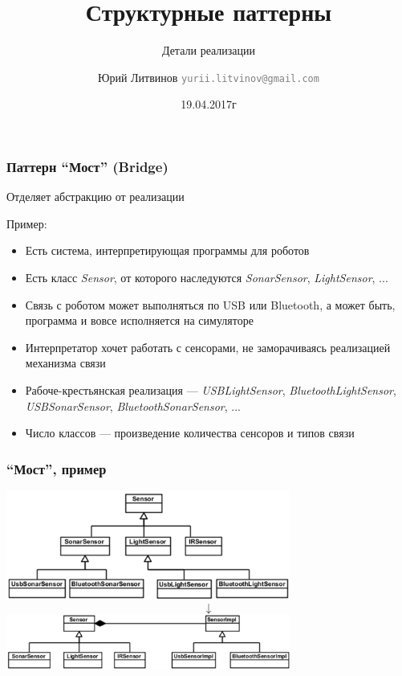 \documentclass[xetex,mathserif,serif]{beamer}
\title{Структурные паттерны}
\subtitle{Детали реализации}
\author[Юрий Литвинов]{Юрий Литвинов \newline \textcolor{gray}{\small\texttt{yurii.litvinov@gmail.com}}}
\date{19.04.2017г}
\begin{document}
	
	\frame{\titlepage}

	\begin{frame}
		\frametitle{Паттерн ``Мост'' (Bridge)}
		Отделяет абстракцию от реализации

		Пример:
		\begin{itemize}
			\item Есть система, интерпретирующая программы для роботов
			\item Есть класс \textit{Sensor}, от которого наследуются \textit{SonarSensor}, \textit{LightSensor}, ...
			\item Связь с роботом может выполняться по USB или Bluetooth, а может быть, программа и вовсе исполняется на симуляторе
			\item Интерпретатор хочет работать с сенсорами, не заморачиваясь реализацией механизма связи
			\item Рабоче-крестьянская реализация --- \textit{USBLightSensor}, \textit{BluetoothLightSensor}, \textit{USBSonarSensor}, \textit{BluetoothSonarSensor}, ...
			\item Число классов --- произведение количества сенсоров и типов связи
		\end{itemize}
	\end{frame}

	\begin{frame}
		\frametitle{``Мост'', пример}
		\begin{center}
			\includegraphics[width=0.7\textwidth]{noBridge.png}
			\Huge{$$\downarrow$$}
			\includegraphics[width=0.7\textwidth]{bridge.png}
		\end{center}
	\end{frame}
\end{document}
